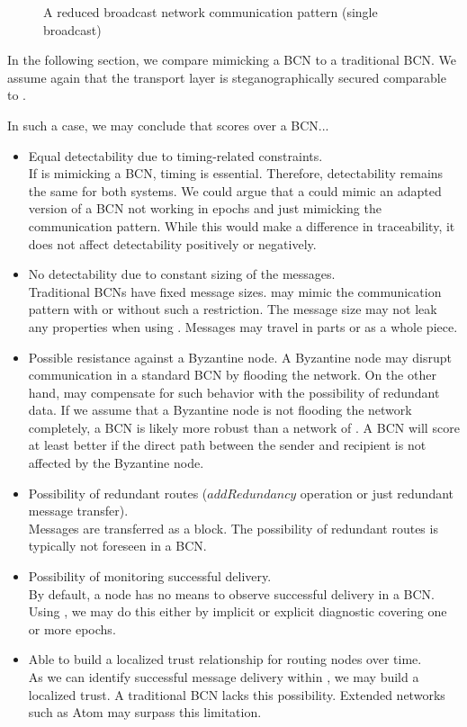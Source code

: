 \begin{figure}[ht]\centering
	
	\caption{A reduced broadcast network communication pattern (single broadcast)}
	\label{fig:bcRedCommPattern}
\end{figure}

In the following section, we compare \MessageVortex{} mimicking a BCN to a traditional BCN. We assume again that the transport layer is steganographically secured comparable to \MessageVortex.

In such a case, we may conclude that \MessageVortex{} scores over a BCN...
\begin{itemize}
	\item Equal detectability due to timing-related constraints.\\
	If \MessageVortex{} is mimicking a BCN, timing is essential. Therefore, detectability remains the same for both systems. We could argue that a \MessageVortex{} could mimic an adapted version of a BCN not working in epochs and just mimicking the communication pattern. While this would make a difference in traceability, it does not affect detectability positively or negatively.
	\item No detectability due to constant sizing of the messages.\\
	Traditional BCNs have fixed message sizes. \MessageVortex{} may mimic the communication pattern with or without such a restriction. The message size may not leak any properties when using \MessageVortex{}. Messages may travel in parts or as a whole piece.
	\item Possible resistance against a Byzantine node.
	A Byzantine node may disrupt communication in a standard BCN by flooding the network. On the other hand, \MessageVortex{} may compensate for such behavior with the possibility of redundant data. If we assume that a Byzantine node is not flooding the network completely, a BCN is likely more robust than a network of \VortexNodes{}. A BCN will score at least better if the direct path between the sender and recipient is not affected by the Byzantine node. 
	\item Possibility of redundant routes ($addRedundancy$ operation or just redundant message transfer).\\
	Messages are transferred as a block. The possibility of redundant routes is typically not foreseen in a BCN.
	\item Possibility of monitoring successful delivery.\\
	By default, a node has no means to observe successful delivery in a BCN. Using \MessageVortex{}, we may do this either by implicit or explicit diagnostic covering one or more epochs.
	\item Able to build a localized trust relationship for routing nodes over time.\\
	As we can identify successful message delivery within \MessageVortex{}, we may build a localized trust. A traditional BCN lacks this possibility. Extended networks such as Atom may surpass this limitation.
\end{itemize}

